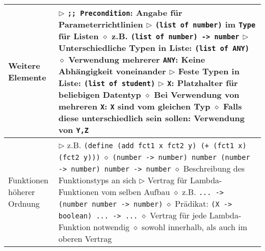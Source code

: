 \begin{tabular}{ | p{} p{} | }
  \makecell[l]{Weitere \\ Elemente} & \makecell[l]{
  $\triangleright$ \texttt{;; Precondition}: Angabe für Parameterrichtlinien \\
  $\triangleright$ \texttt{(list of number)} im \texttt{Type} für Listen \\
  \hspace{0.4cm} $\diamond$ z.B. \texttt{(list of number) -> number} \\
  $\triangleright$ Unterschiedliche Typen in Liste: \texttt{(list of ANY)} \\
  \hspace{0.4cm} $\diamond$ Verwendung mehrerer \texttt{ANY}: Keine Abhängigkeit voneinander \\
  $\triangleright$ Feste Typen in Liste: \texttt{(list of student)} \\
  $\triangleright$ \texttt{X}: Platzhalter für beliebigen Datentyp \\
  \hspace{0.4cm} $\diamond$ Bei Verwendung von mehreren \texttt{X}: \texttt{X} sind vom gleichen Typ \\
  \hspace{0.4cm} $\diamond$ Falls diese unterschiedlich sein sollen: Verwendung von \texttt{Y,Z} \\
  } \\ \hline

  \makecell[l]{Funktionen höherer \\ Ordnung} & \makecell[l]{
  $\triangleright$ z.B. \texttt{(define (add fct1 x fct2 y) (+ (fct1 x) (fct2 y)))} \\
  \hspace{0.4cm} $\diamond$ \texttt{(number -> number) number (number -> number) number -> number} \\
  \hspace{0.4cm} $\diamond$ Beschreibung des Funktionstyps an sich \\
  $\triangleright$ Vertrag für Lambda-Funktionen vom selben Aufbau \\
  \hspace{0.4cm} $\diamond$ z.B. \texttt{... -> (number number -> number)} \\
  \hspace{0.4cm} $\diamond$ Prädikat: \texttt{(X -> boolean) ... -> ...} \\
  \hspace{0.4cm} $\diamond$ Vertrag für jede Lambda-Funktion notwendig \\
  \hspace{0.4cm} $\diamond$ sowohl innerhalb, als auch im oberen Vertrag} \\ \hline

  \end{tabular}




